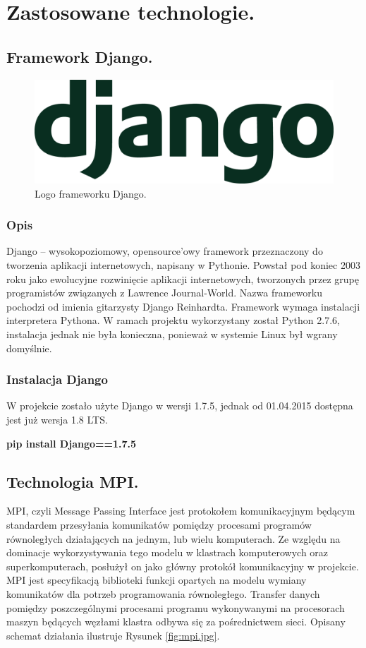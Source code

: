 \documentclass[a4paper,12pt]{article}		%
\begin{document}
\section{Zastosowane technologie.}

\subsection{Framework Django.}

\begin{figure}[h!]
\centering
\includegraphics[scale =0.2]{Resources/django.png}
\caption{Logo frameworku Django.} 
\end{figure}

\subsubsection{Opis}
Django – wysokopoziomowy, opensource’owy framework przeznaczony do tworzenia aplikacji internetowych, napisany w Pythonie. Powstał pod koniec 2003 roku jako ewolucyjne rozwinięcie aplikacji internetowych, tworzonych przez grupę programistów związanych z Lawrence Journal-World. Nazwa frameworku pochodzi od imienia gitarzysty Django Reinhardta.
Framework wymaga instalacji interpretera Pythona. W ramach projektu wykorzystany został Python 2.7.6, instalacja jednak nie była konieczna, ponieważ w systemie Linux był wgrany domyślnie.

\subsubsection{Instalacja Django}
W projekcie zostało użyte Django w wersji 1.7.5, jednak od 01.04.2015 dostępna jest już wersja 1.8 LTS.

\begin{center}
\textbf{pip install Django==1.7.5}
\end{center}
\newpage
\subsection{Technologia MPI.}
MPI, czyli Message Passing Interface jest protokołem komunikacyjnym będącym standardem przesyłania komunikatów pomiędzy procesami programów równoległych działających na jednym, lub wielu komputerach. Ze względu na dominacje wykorzystywania tego modelu w klastrach komputerowych oraz superkomputerach, posłużył on jako główny protokół komunikacyjny w projekcie.
MPI jest specyfikacją biblioteki funkcji opartych na modelu wymiany komunikatów dla potrzeb programowania równoległego. Transfer danych pomiędzy poszczególnymi procesami programu wykonywanymi na procesorach maszyn będących węzłami klastra odbywa się za pośrednictwem sieci. Opisany schemat działania ilustruje Rysunek \ref{fig:mpi.jpg}.
\end{document}
